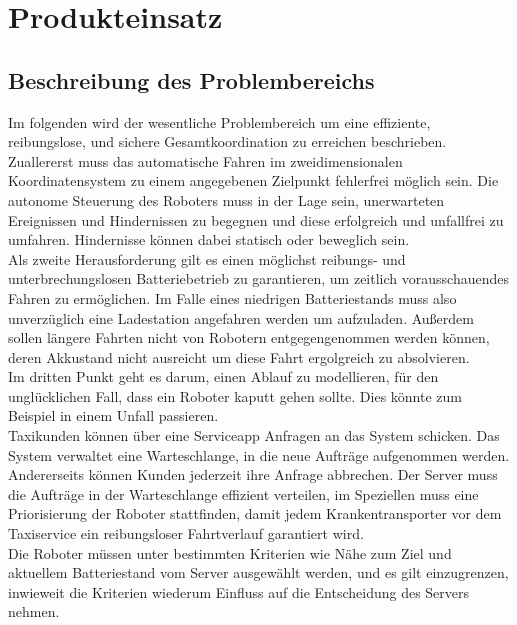 
	\section{Produkteinsatz}
	
	\subsection{Beschreibung des Problembereichs}
	Im folgenden wird der wesentliche Problembereich um eine effiziente, reibungslose, und sichere Gesamtkoordination zu erreichen beschrieben.\\

Zuallererst muss das automatische Fahren im zweidimensionalen Koordinatensystem zu einem angegebenen Zielpunkt fehlerfrei möglich sein. 
	Die autonome Steuerung des Roboters muss in der Lage sein, unerwarteten Ereignissen und Hindernissen zu begegnen und diese erfolgreich und unfallfrei zu umfahren. Hindernisse können dabei statisch oder beweglich sein.\\
	
Als zweite Herausforderung gilt es einen möglichst reibungs- und unterbrechungslosen Batteriebetrieb zu garantieren, um zeitlich vorausschauendes Fahren zu ermöglichen. Im Falle eines niedrigen Batteriestands muss also unverzüglich eine Ladestation angefahren werden um aufzuladen. Außerdem sollen längere Fahrten nicht von Robotern entgegengenommen werden können, deren Akkustand nicht ausreicht um diese Fahrt ergolgreich zu absolvieren.\\

Im dritten Punkt geht es darum, einen Ablauf zu modellieren, für den unglücklichen Fall, dass ein Roboter kaputt gehen sollte. Dies könnte zum Beispiel in einem Unfall passieren.\\

Taxikunden können über eine Serviceapp Anfragen an das System schicken. Das System verwaltet eine Warteschlange, in die neue Aufträge aufgenommen werden. Andererseits können Kunden jederzeit ihre Anfrage abbrechen. Der Server muss die Aufträge in der Warteschlange effizient verteilen, im Speziellen muss eine Priorisierung der Roboter stattfinden, damit jedem Krankentransporter vor dem Taxiservice ein reibungsloser Fahrtverlauf garantiert wird.\\

Die Roboter müssen unter bestimmten Kriterien wie Nähe zum Ziel und aktuellem Batteriestand vom Server ausgewählt werden, und es gilt einzugrenzen, inwieweit die Kriterien wiederum Einfluss auf die Entscheidung des Servers nehmen.\\

